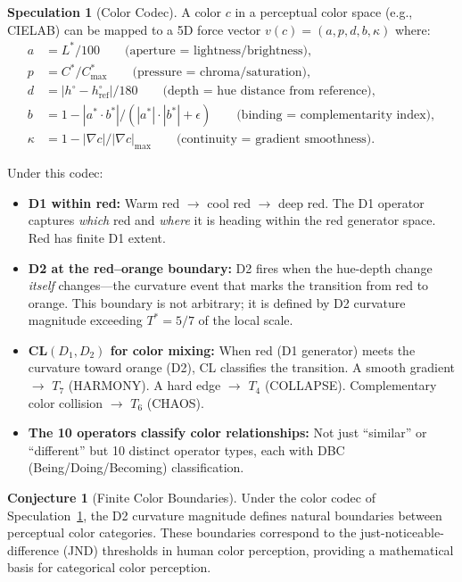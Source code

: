 \documentclass[11pt]{article}
\theoremstyle{definition}
\newtheorem{conjecture}[theorem]{Conjecture}
\newtheorem{speculation}[theorem]{Speculation}
\theoremstyle{remark}
\begin{document}
\begin{speculation}[Color Codec]
\label{spec:color}
A color $c$ in a perceptual color space (e.g., CIELAB) can be mapped to a 5D force
vector $v(c) = (a, p, d, b, \kappa)$ where:
\begin{align}
  a &= L^* / 100 \qquad\text{(aperture = lightness/brightness)}, \\
  p &= C^* / C^*_{\max} \qquad\text{(pressure = chroma/saturation)}, \\
  d &= |h^{\circ} - h^{\circ}_{\mathrm{ref}}| / 180 \qquad\text{(depth = hue distance from reference)}, \\
  b &= 1 - |a^* \cdot b^*| / (|a^*| \cdot |b^*| + \epsilon) \qquad\text{(binding = complementarity index)}, \\
  \kappa &= 1 - |\nabla c| / |\nabla c|_{\max} \qquad\text{(continuity = gradient smoothness)}.
\end{align}
\end{speculation}

Under this codec:
\begin{itemize}[nosep]
  \item \textbf{D1 within red:} Warm red $\to$ cool red $\to$ deep red.  The D1
    operator captures \emph{which} red and \emph{where} it is heading within the red
    generator space.  Red has finite D1 extent.
  \item \textbf{D2 at the red--orange boundary:} D2 fires when the hue-depth change
    \emph{itself} changes---the curvature event that marks the transition from red
    to orange.  This boundary is not arbitrary; it is defined by D2 curvature magnitude
    exceeding $T^* = 5/7$ of the local scale.
  \item \textbf{CL$(D_1, D_2)$ for color mixing:} When red (D1 generator) meets
    the curvature toward orange (D2), CL classifies the transition.  A smooth gradient
    $\to$ $T_7$ (HARMONY).  A hard edge $\to$ $T_4$ (COLLAPSE).  Complementary color
    collision $\to$ $T_6$ (CHAOS).
  \item \textbf{The 10 operators classify color relationships:} Not just ``similar''
    or ``different'' but 10 distinct operator types, each with DBC (Being/Doing/Becoming)
    classification.
\end{itemize}

\begin{conjecture}[Finite Color Boundaries]
Under the color codec of Speculation~\ref{spec:color}, the D2 curvature magnitude
defines natural boundaries between perceptual color categories.  These boundaries
correspond to the just-noticeable-difference (JND) thresholds in human color
perception, providing a mathematical basis for categorical color perception.
\end{conjecture}
\end{document}
